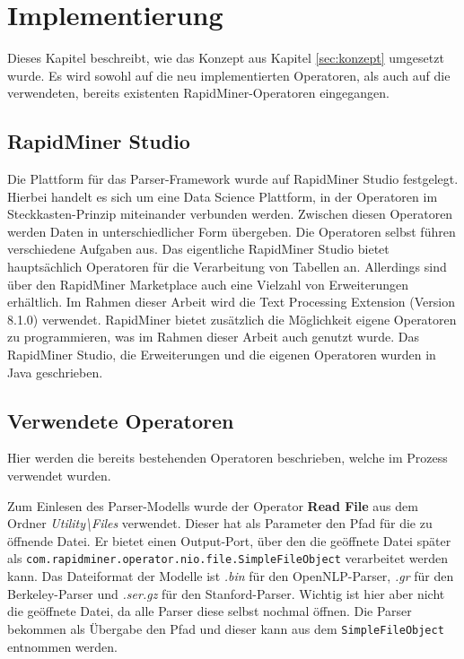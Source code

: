 %
\chapter{Implementierung}
\label{sec:impl}
Dieses Kapitel beschreibt, wie das Konzept aus Kapitel \ref{sec:konzept} umgesetzt wurde. Es wird sowohl auf die neu implementierten Operatoren, als auch auf die verwendeten, bereits existenten RapidMiner-Operatoren eingegangen. 

\section{RapidMiner Studio}
\label{sec:impl:rms}

Die Plattform für das Parser-Framework wurde auf RapidMiner Studio \cite{rmstudio} festgelegt. Hierbei handelt es sich um eine Data Science Plattform, in der Operatoren im Steckkasten-Prinzip miteinander verbunden werden. Zwischen diesen Operatoren werden Daten in unterschiedlicher Form übergeben. Die Operatoren selbst führen verschiedene Aufgaben aus. Das eigentliche RapidMiner Studio bietet hauptsächlich Operatoren für die Verarbeitung von Tabellen an. Allerdings sind über den RapidMiner Marketplace auch eine Vielzahl von Erweiterungen erhältlich. Im Rahmen dieser Arbeit wird die Text Processing Extension (Version 8.1.0) \cite{textExt} %
verwendet. RapidMiner bietet zusätzlich die Möglichkeit eigene Operatoren zu programmieren, was im Rahmen dieser Arbeit auch genutzt wurde. Das RapidMiner Studio, die Erweiterungen und die eigenen Operatoren wurden in Java geschrieben. \\

\section{Verwendete Operatoren}
\label{sec:impl:vwo}

Hier werden die bereits bestehenden Operatoren beschrieben, welche im Prozess verwendet wurden.

Zum Einlesen des Parser-Modells wurde der Operator \textbf{Read File} aus dem Ordner \textit{Utility\textbackslash Files} verwendet. Dieser hat als Parameter den Pfad für die zu öffnende Datei. Er bietet einen Output-Port, über den die geöffnete Datei später als \texttt{com.rapidminer.operator.nio.file.SimpleFileObject} verarbeitet werden kann. Das Dateiformat der Modelle ist \textit{.bin} für den OpenNLP-Parser, \textit{.gr} für den Berkeley-Parser und \textit{.ser.gz} für den Stanford-Parser. Wichtig ist hier aber nicht die geöffnete Datei, da alle Parser diese selbst nochmal öffnen. Die Parser bekommen als Übergabe den Pfad und dieser kann aus dem \texttt{SimpleFileObject} entnommen werden.

